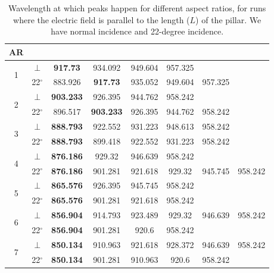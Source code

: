 \begin{table}
    \centering
      \caption{Wavelength at which peaks happen for different aspect ratios, for runs where the electric
      field is parallel to the length ($L$) of the pillar. We have normal incidence and 22-degree incidence.}
      \label{tab:ar_peaks}
      \begin{tabular}{c c c c c c c c}
        \textbf{AR} \\
        \hline
        \multirow{2}{*}{1} & $\perp$ & \textbf{917.73} & 934.092 & 949.604 & 957.325 \\ %
        & 22$^{\circ}$ & 883.926 & \textbf{917.73} & 935.052 & 949.604 & 957.325 \\ %
        \hline
        \multirow{2}{*}{2} & $\perp$ & \textbf{903.233} & 926.395 & 944.762 & 958.242 \\ %
        & 22$^{\circ}$ & 896.517 & \textbf{903.233} & 926.395 & 944.762 & 958.242 \\ %
        \hline
        \multirow{2}{*}{3} & $\perp$ & \textbf{888.793} & 922.552 & 931.223 & 948.613 & 958.242 \\ %
        & 22$^{\circ}$ & \textbf{888.793} & 899.418 & 922.552 & 931.223 & 958.242 \\ %
        \hline
        \multirow{2}{*}{4} & $\perp$ & \textbf{876.186} & 929.32 & 946.639 & 958.242 \\ %
        & 22$^{\circ}$ & \textbf{876.186} & 901.281 & 921.618 & 929.32 & 945.745 & 958.242 \\ %
        \hline
        \multirow{2}{*}{5} & $\perp$ & \textbf{865.576} & 926.395 & 945.745 & 958.242 \\ %
        & 22$^{\circ}$ & \textbf{865.576} & 901.281 & 921.618 & 958.242 \\ %
        \hline
        \multirow{2}{*}{6} & $\perp$ &  \textbf{856.904} & 914.793 & 923.489 & 929.32 & 946.639 & 958.242\\ %
        & 22$^{\circ}$ & \textbf{856.904} & 901.281 & 920.6 & 958.242\\ %
        \hline
        \multirow{2}{*}{7} & $\perp$ &  \textbf{850.134} & 910.963 & 921.618 & 928.372 & 946.639 & 958.242 \\ %
        & 22$^{\circ}$ & \textbf{850.134} & 901.281 & 910.963 & 920.6 & 958.242\\ %
        \hline
      \end{tabular}
\end{table}

